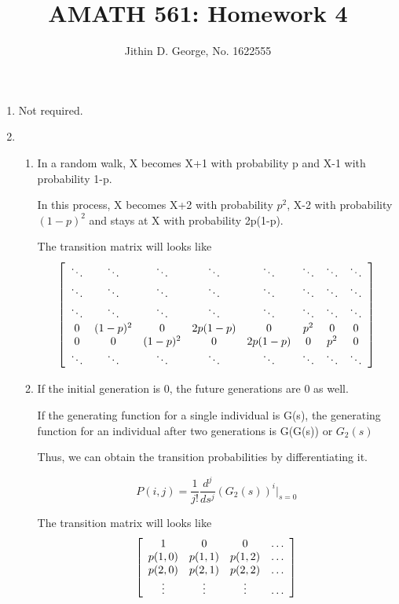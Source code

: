 \documentclass[a4paper,11pt]{article}
\title{AMATH 561: Homework 4}
\author{Jithin D. George, No. 1622555}
\newenvironment{mat}{\left[ \begin{array}{ccccccccccccc}}{\end{array}\right]}
\newcommand\bcm{\begin{mat}}
\newcommand\ecm{\end{mat}}
\begin{document}
\maketitle
\begin{enumerate}

\item Not required.

\item 

\begin{enumerate}
 \item 
 In a random walk, X becomes X+1 with probability p and X-1 with probability 1-p.
 
 In this process, X becomes X+2 with probability $p^2$, X-2 with probability $(1-p)^2$
 and stays at X with probability 2p(1-p).
 
 The transition matrix will looks like
 \[ \bcm  \ddots &\ddots  &\ddots &\ddots &\ddots  &\ddots  &\ddots &\ddots  \\ \ddots &\ddots  &\ddots &\ddots &\ddots  &\ddots  &\ddots &\ddots   \\  \ddots &\ddots  &\ddots &\ddots &\ddots  &\ddots  &\ddots &\ddots   \\ 0 &(1-p)^2  &0 &2p(1-p) &0 &p^2 &0 &0 \\ 0  &0 &(1-p)^2  &0 &2p(1-p) &0 &p^2 &0 \\ \ddots &\ddots  &\ddots &\ddots &\ddots  &\ddots  &\ddots &\ddots  \\     \ecm\]


\item

If the initial generation is 0, the future generations are 0 as well.

If the generating function for a single individual is G(s), the generating function for an individual after two generations is G(G(s)) or $G_2(s)$

Thus, we can obtain the transition probabilities by differentiating it.

\[P(i,j) = \frac{1}{j!}\frac{d^j}{ds^j}(G_2(s))^i|_{s=0}\]

 The transition matrix will looks like
 \[ \bcm  1 & 0  &0  &\hdots   \\ p(1,0) & p(1,1)  &p(1,2) &\hdots \\ p(2,0) & p(2,1)  &p(2,2) &\hdots  \\ \vdots &\vdots  &\vdots  &\hdots   \\     \ecm\]




\end{enumerate}
\end{enumerate}
\end{document}
